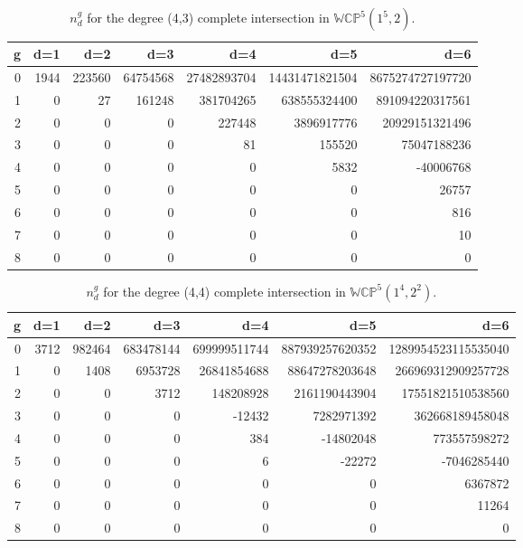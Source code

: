 \documentclass[12pt]{article}
\begin{document}
\begin{table}
\begin{centering}
\begin{tabular}{|r|rrrrrr|}
\hline
g &d=1 &d=2 &d=3 &d=4 &d=5 &d=6 \\
\hline
0& 1944& 223560& 64754568& 27482893704& 14431471821504& 8675274727197720\\
1&  0& 27& 161248& 381704265& 638555324400& 891094220317561\\
2& 0& 0& 0& 227448& 3896917776& 20929151321496\\
3& 0& 0& 0& 81& 155520& 75047188236\\
4& 0& 0& 0& 0& 5832& -40006768\\
5& 0& 0& 0& 0& 0& 26757\\
6& 0& 0& 0& 0& 0& 816\\
7& 0& 0& 0& 0& 0& 10\\
8&  0& 0& 0& 0& 0& 0\\
\hline
\end{tabular}
\caption{ $n^g_d$ for the degree (4,3) complete intersection in $\mathbb{WCP}^5(1^5,2)$.}
\end{centering}
\end{table}


\begin{table}
\begin{centering}
\begin{tabular}{|r|rrrrrr|}
\hline
g &d=1 &d=2 &d=3 &d=4 &d=5 &d=6 \\
\hline
0& 3712& 982464& 683478144& 699999511744& 887939257620352& 1289954523115535040\\
1& 0& 1408& 6953728& 26841854688& 88647278203648& 266969312909257728\\
2& 0& 0& 3712& 148208928& 2161190443904& 17551821510538560\\
3& 0& 0& 0& -12432& 7282971392& 362668189458048\\
4&0& 0&0& 384& -14802048& 773557598272\\
5& 0& 0& 0& 6& -22272& -7046285440\\
6& 0& 0& 0& 0& 0& 6367872\\
7& 0& 0& 0& 0& 0& 11264\\
8& 0& 0& 0& 0& 0& 0\\
\hline
\end{tabular}
\caption{$n^g_d$ for the degree (4,4) complete intersection in $\mathbb{WCP}^5(1^4,2^2)$.}
\end{centering}
\end{table}
\end{document}
